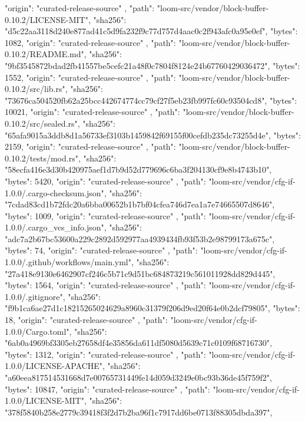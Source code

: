 {{      "origin": "curated-release-source"
    },
    {
      "path": "loom-src/vendor/block-buffer-0.10.2/LICENSE-MIT",
      "sha256": "d5c22aa3118d240e877ad41c5d9fa232f9c77d757d4aac0c2f943afc0a95e0ef",
      "bytes": 1082,
      "origin": "curated-release-source"
    },
    {
      "path": "loom-src/vendor/block-buffer-0.10.2/README.md",
      "sha256": "9bf3545872bdad2fb41557be5cefc21a48f0c7804f8124e24b67760429036472",
      "bytes": 1552,
      "origin": "curated-release-source"
    },
    {
      "path": "loom-src/vendor/block-buffer-0.10.2/src/lib.rs",
      "sha256": "73676ca504520fb62a25bcc442674774cc79cf27f5eb23fb997fc60c93504cd8",
      "bytes": 10021,
      "origin": "curated-release-source"
    },
    {
      "path": "loom-src/vendor/block-buffer-0.10.2/src/sealed.rs",
      "sha256": "65afa9015a3ddb8d1a56733ef3103b1459842f69155f00cefdb235dc73255d4e",
      "bytes": 2159,
      "origin": "curated-release-source"
    },
    {
      "path": "loom-src/vendor/block-buffer-0.10.2/tests/mod.rs",
      "sha256": "58ecfa416e3d30b420975aef1d7b9d52d779696c6ba3f204130cf9e8b4743b10",
      "bytes": 5420,
      "origin": "curated-release-source"
    },
    {
      "path": "loom-src/vendor/cfg-if-1.0.0/.cargo-checksum.json",
      "sha256": "7cdad83cd1b72fdc20a6bba00652b1b7bf04cfea746d7ea1a7e74665507d8646",
      "bytes": 1009,
      "origin": "curated-release-source"
    },
    {
      "path": "loom-src/vendor/cfg-if-1.0.0/.cargo_vcs_info.json",
      "sha256": "adc7a2b67bc53600a229c2892d592977aa4939434fb93f53b2e98799173a675c",
      "bytes": 74,
      "origin": "curated-release-source"
    },
    {
      "path": "loom-src/vendor/cfg-if-1.0.0/.github/workflows/main.yml",
      "sha256": "27a418e9130e6462907cf246c5b71c9d51bc684873219c561011928dd829d445",
      "bytes": 1564,
      "origin": "curated-release-source"
    },
    {
      "path": "loom-src/vendor/cfg-if-1.0.0/.gitignore",
      "sha256": "f9b1ca6ae27d1c18215265024629a8960c31379f206d9ed20f64e0b2dcf79805",
      "bytes": 18,
      "origin": "curated-release-source"
    },
    {
      "path": "loom-src/vendor/cfg-if-1.0.0/Cargo.toml",
      "sha256": "6ab0a4969bf3305eb27658df4e35856da611df5080d5639c71c0109f68716730",
      "bytes": 1312,
      "origin": "curated-release-source"
    },
    {
      "path": "loom-src/vendor/cfg-if-1.0.0/LICENSE-APACHE",
      "sha256": "a60eea817514531668d7e00765731449fe14d059d3249e0bc93b36de45f759f2",
      "bytes": 10847,
      "origin": "curated-release-source"
    },
    {
      "path": "loom-src/vendor/cfg-if-1.0.0/LICENSE-MIT",
      "sha256": "378f5840b258e2779c39418f3f2d7b2ba96f1c7917dd6be0713f88305dbda397",
}}
